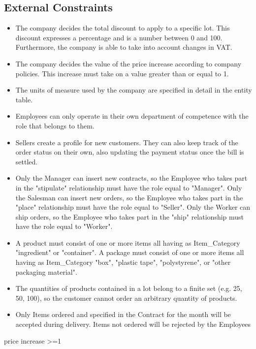 \subsection{External Constraints}
\begin{itemize}
\item The company decides the total discount to apply to a specific lot. This discount expresses a percentage and is a number between 0 and 100. Furthermore, the company is able to take into account changes in VAT.
\item The company decides the value of the price increase according to company policies. This increase must take on a value greater than or equal to 1.
\item The units of measure used by the company are specified in detail in the entity table.
\item Employees can only operate in their own department of competence with the role that belongs to them.
\item Sellers create a profile for new customers. They can also keep track of the order status on their own, also updating the payment status once the bill is settled.
\item Only the Manager can insert new contracts, so the Employee who takes part in the "stipulate" relationship must have the role equal to "Manager". Only the Salesman can insert new orders, so the Employee who takes part in the "place" relationship must have the role equal to "Seller". Only the Worker can ship orders, so the Employee who takes part in the "ship" relationship must have the role equal to "Worker".
\item A product must consist of one or more items all having as Item\_Category "ingredient" or "container". A package must consist of one or more items all having as Item\_Category "box", "plastic tape", "polystyrene", or "other packaging material". %
\item The quantities of products contained in a lot belong to a finite set (e.g. 25, 50, 100), so the customer cannot order an arbitrary quantity of products.
\item Only Items ordered and specified in the Contract for the month will be accepted during delivery. Items not ordered will be rejected by the Employees
\end{itemize}

price increase >=1